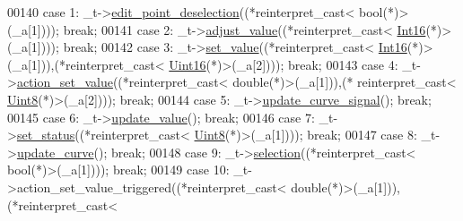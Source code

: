 \begin{DoxyCode}
00140         \textcolor{keywordflow}{case} 1: \_t->\hyperlink{a00004_a2b9629d20c2b97c01bf8486c89fd0148}{edit\_point\_deselection}((*\textcolor{keyword}{reinterpret\_cast<} \textcolor{keywordtype}{bool}(*)\textcolor{keyword}{>}(\_a[1]))); \textcolor{keywordflow}{
      break};
00141         \textcolor{keywordflow}{case} 2: \_t->\hyperlink{a00004_a74d292de22b341313df1852cb1033704}{adjust\_value}((*\textcolor{keyword}{reinterpret\_cast<} \hyperlink{a00001_a3985266aecb120f269789241c170850c}{Int16}(*)\textcolor{keyword}{>}(\_a[1]))); \textcolor{keywordflow}{break};
00142         \textcolor{keywordflow}{case} 3: \_t->\hyperlink{a00004_a9d26460f253a29dd961b20be0afb5358}{set\_value}((*\textcolor{keyword}{reinterpret\_cast<} \hyperlink{a00001_a3985266aecb120f269789241c170850c}{Int16}(*)\textcolor{keyword}{>}(\_a[1])),(*\textcolor{keyword}{reinterpret\_cast<} 
      \hyperlink{a00001_aae7407b021d43f7193a81a58cfb3e297}{Uint16}(*)\textcolor{keyword}{>}(\_a[2]))); \textcolor{keywordflow}{break};
00143         \textcolor{keywordflow}{case} 4: \_t->\hyperlink{a00004_a7c1fa0d7d1623b11d4badceb1854010e}{action\_set\_value}((*\textcolor{keyword}{reinterpret\_cast<} \textcolor{keywordtype}{double}(*)\textcolor{keyword}{>}(\_a[1])),(*\textcolor{keyword}{
      reinterpret\_cast<} \hyperlink{a00001_a979e3e23b9a449e69ab6a8a83b6042f8}{Uint8}(*)\textcolor{keyword}{>}(\_a[2]))); \textcolor{keywordflow}{break};
00144         \textcolor{keywordflow}{case} 5: \_t->\hyperlink{a00004_a7dfbddd62d6782b0f0ce809cbf2338ba}{update\_curve\_signal}(); \textcolor{keywordflow}{break};
00145         \textcolor{keywordflow}{case} 6: \_t->\hyperlink{a00004_ad5f20fdbb4731185020ff4e90cd1ead2}{update\_value}(); \textcolor{keywordflow}{break};
00146         \textcolor{keywordflow}{case} 7: \_t->\hyperlink{a00004_a9476424a86a6ed4f84c64d0ac77143cc}{set\_status}((*\textcolor{keyword}{reinterpret\_cast<} \hyperlink{a00001_a979e3e23b9a449e69ab6a8a83b6042f8}{Uint8}(*)\textcolor{keyword}{>}(\_a[1]))); \textcolor{keywordflow}{break};
00147         \textcolor{keywordflow}{case} 8: \_t->\hyperlink{a00004_a15cbcf5f0a17281468800f47898f60c1}{update\_curve}(); \textcolor{keywordflow}{break};
00148         \textcolor{keywordflow}{case} 9: \_t->\hyperlink{a00004_a86f994dedec393af88b5d1a37b1e30b5}{selection}((*\textcolor{keyword}{reinterpret\_cast<} \textcolor{keywordtype}{bool}(*)\textcolor{keyword}{>}(\_a[1]))); \textcolor{keywordflow}{break};
00149         \textcolor{keywordflow}{case} 10: \_t->action\_set\_value\_triggered((*\textcolor{keyword}{reinterpret\_cast<} \textcolor{keywordtype}{double}(*)\textcolor{keyword}{>}(\_a[1])),(*\textcolor{keyword}{reinterpret\_cast<} 

\end{DoxyCode}
